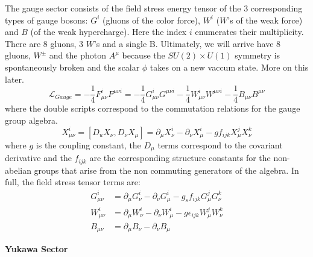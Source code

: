 The gauge sector consists of the field stress energy tensor of the 3 corresponding types of gauge bosons:
 $G^i$ (gluons of the color force), $W^i$ ($W$'s of the weak force) and $B$ (of the weak hypercharge). Here the index $i$ enumerates their multiplicity. There are 8 gluons, 3 $W$'s and a single B. Ultimately, we will arrive have 8 gluons, $W^{\pm}$ and the photon $A^\mu$ because the $SU(2)\times U(1)$ 
symmetry is spontaneously broken and the scalar $\phi$ takes on a new vaccum state. More on this later.
\begin{equation}
\mathcal{L}_{Gauge} = - \frac{1}{4} F_{\mu\nu}^{i} F^{\mu\nu i} =  - \frac{1}{4} G_{\mu\nu}^{i} G^{\mu\nu i} - \frac{1}{4} W^{i}_{\mu\nu} W^{\mu\nu i} - \frac{1}{4} B_{\mu\nu}B^{\mu\nu} 
\end{equation}
where the double scripts correspond to the commutation relations for the gauge group algebra. 
\begin{equation}
X_{\mu\nu}^i   = [D_u X_\nu, D_\nu X_\mu] = \partial_\mu X_\nu^i - \partial_\nu X_\mu^i - g f_{ijk} X_\mu^j X_\nu^k
\end{equation}
where $g$ is the coupling constant, the $D_\mu$ terms correspond to the covariant derivative and the $f_{ijk}$ are the corresponding structure constants for the non-abelian groups that arise from the non commuting generators of the algebra. In full, the field stress tensor terms are:
\begin{align*}
G_{\mu\nu}^i &=  \partial_\mu G_\nu^i - \partial_\nu G_\mu^i - g_s f_{ijk} G_\mu^j G_\nu^k\\ 
W_{\mu\nu}^i &=  \partial_\mu W_\nu^i - \partial_\nu W_\mu^i - g \epsilon_{ijk} W_\mu^j W_\nu^k\\ 
B_{\mu\nu} &=  \partial_\mu B_\nu - \partial_\nu B_\mu
\end{align*}

\textbf{Yukawa Sector}

